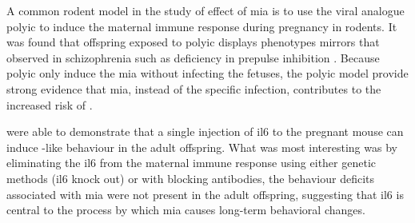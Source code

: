 	A common rodent model in the study of effect of \gls{mia} is to use the viral analogue \gls{polyic} to induce the maternal immune response during pregnancy in rodents.
	It was found that offspring exposed to \gls{polyic} displays phenotypes mirrors that observed in schizophrenia \citep{Li2009c,Meyer2009b,Li2010a} such as deficiency in prepulse inhibition \citep{Cadenhead2000}.
	Because \gls{polyic} only induce the \gls{mia} without infecting the fetuses, the \gls{polyic} model provide strong evidence that \gls{mia}, instead of the specific infection, contributes to the increased risk of .	
	
	\citet{Smith2007} were able to demonstrate that a single injection of \gls{il6} to the pregnant mouse can induce -like behaviour in the adult offspring. 
	What was most interesting was by eliminating the \gls{il6} from the maternal immune response using either genetic methods (\gls{il6} knock out) or with blocking antibodies, the behaviour deficits associated with \gls{mia} were not present in the adult offspring, suggesting that \gls{il6} is central to the process by which \gls{mia} causes long-term behavioral changes.
	
